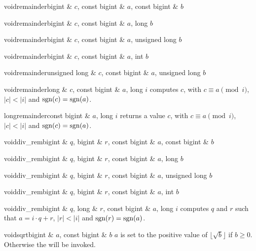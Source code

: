 \begin{fcode}{void}{remainder}{bigint & $c$, const bigint & $a$, const bigint & $b$}\end{fcode}
\begin{fcode}{void}{remainder}{bigint & $c$, const bigint & $a$, long $b$}\end{fcode}
\begin{fcode}{void}{remainder}{bigint & $c$, const bigint & $a$, unsigned long $b$}\end{fcode}
\begin{fcode}{void}{remainder}{bigint & $c$, const bigint & $a$, int $b$}\end{fcode}
\begin{fcode}{void}{remainder}{unsigned long & $c$, const bigint & $a$, unsigned long $b$}\end{fcode}
\begin{fcode}{void}{remainder}{long & $c$, const bigint & $a$, long $i$}
  computes $c$, with $c \equiv a \pmod{i}$, $|c| < |i|$ and $\operatorname{sgn}(c) = \operatorname{sgn}(a)$.
\end{fcode}

\begin{fcode}{long}{remainder}{const bigint & $a$, long $i$}
  returns a value $c$, with $c \equiv a \pmod{i}$, $|c| < |i|$ and $\operatorname{sgn}(c) = \operatorname{sgn}(a)$.
\end{fcode}

\begin{fcode}{void}{div_rem}{bigint & $q$,  bigint & $r$, const bigint & $a$, const bigint & $b$}\end{fcode}
\begin{fcode}{void}{div_rem}{bigint & $q$,  bigint & $r$, const bigint & $a$, long $b$}\end{fcode}
\begin{fcode}{void}{div_rem}{bigint & $q$,  bigint & $r$, const bigint & $a$, unsigned long $b$}\end{fcode}
\begin{fcode}{void}{div_rem}{bigint & $q$,  bigint & $r$, const bigint & $a$, int $b$}\end{fcode}
\begin{fcode}{void}{div_rem}{bigint & $q$, long & $r$, const bigint & $a$, long $i$}
  computes $q$ and $r$ such that $a = i \cdot q + r$, $|r| < |i|$ and $\operatorname{sgn}(r) = \operatorname{sgn}(a)$.
\end{fcode}

\begin{fcode}{void}{sqrt}{bigint & $a$, const bigint & $b$}
  $a$ is set to the positive value of $\lfloor \sqrt{b} \rfloor$ if $b \geq 0$.  Otherwise the
  \LEH will be invoked.
\end{fcode}

